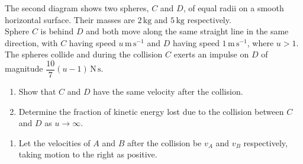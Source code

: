\documentclass[leqno]{article}
\begin{document}
\begin{enumerate}[
  label=\textbf{\arabic*.},
  leftmargin=*,
  topsep=0pt,
  partopsep=0pt,
  parsep=0pt
]
\begin{figure}[H]
    \centering
{}
\end{figure}


The second diagram shows two spheres, $C$ and $D$, of equal radii on a smooth horizontal surface. Their masses are $2\,\mathrm{kg}$ and $5\,\mathrm{kg}$ respectively. \\

Sphere $C$ is behind $D$ and both move along the same straight line in the same direction, with $C$ having speed $u\,\mathrm{m}\,\mathrm{s}^{-1}$ and $D$ having speed $1\,\mathrm{m}\,\mathrm{s}^{-1}$, where $u>1$.  \\

The spheres collide and during the collision $C$ exerts an impulse on $D$ of magnitude $\dfrac{10}{7}(u-1)\,\mathrm{N}\,\mathrm{s}$. \\
\begin{enumerate}[label=\textbf{(\alph*)}, resume]
  \item Show that $C$ and $D$ have the same velocity after the collision.  \\
  \item Determine the fraction of kinetic energy lost due to the collision between $C$ and $D$ as $u \to \infty$.  \\
\end{enumerate}

\vspace*{10pt}

\begin{djsSolution}
\begin{enumerate}[label=\textbf{(\alph*)}]
  \item Let the velocities of $A$ and $B$ after the collision be $v_A$ and $v_B$ respectively, taking motion to the right as positive.


\end{enumerate}
\end{djsSolution}
\end{enumerate}
\end{document}
